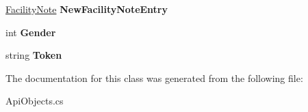 \begin{DoxyCompactItemize}
\mbox{\hyperlink{class_golf_now_a_p_i_1_1_facility_note}{Facility\+Note}} {\bfseries New\+Facility\+Note\+Entry}
\item 
\mbox{\label{class_golf_now_a_p_i_1_1_customer_profile_a6d4ab1e57084ebc0d0d0bf119d030675}} 
int {\bfseries Gender}
\item 
\mbox{\label{class_golf_now_a_p_i_1_1_customer_profile_ad34a56e25bee13c0bcd3a89d244097e8}} 
string {\bfseries Token}
\end{DoxyCompactItemize}


The documentation for this class was generated from the following file\+:\begin{DoxyCompactItemize}
\item 
Api\+Objects.\+cs\end{DoxyCompactItemize}
